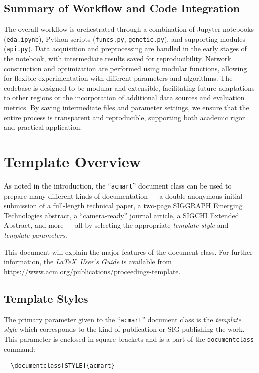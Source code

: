 \documentclass[manuscript,screen,review]{acmart}
\begin{document}
\subsection{Summary of Workflow and Code Integration}
The overall workflow is orchestrated through a combination of Jupyter notebooks (\texttt{eda.ipynb}), Python scripts (\texttt{funcs.py}, \texttt{genetic.py}), and supporting modules (\texttt{api.py}). Data acquisition and preprocessing are handled in the early stages of the notebook, with intermediate results saved for reproducibility. Network construction and optimization are performed using modular functions, allowing for flexible experimentation with different parameters and algorithms. The codebase is designed to be modular and extensible, facilitating future adaptations to other regions or the incorporation of additional data sources and evaluation metrics. By saving intermediate files and parameter settings, we ensure that the entire process is transparent and reproducible, supporting both academic rigor and practical application.

\section{Template Overview}
As noted in the introduction, the ``\verb|acmart|'' document class can
be used to prepare many different kinds of documentation --- a
double-anonymous initial submission of a full-length technical paper, a
two-page SIGGRAPH Emerging Technologies abstract, a ``camera-ready''
journal article, a SIGCHI Extended Abstract, and more --- all by
selecting the appropriate {\itshape template style} and {\itshape
  template parameters}.

This document will explain the major features of the document
class. For further information, the {\itshape \LaTeX\ User's Guide} is
available from
\url{https://www.acm.org/publications/proceedings-template}.

\subsection{Template Styles}

The primary parameter given to the ``\verb|acmart|'' document class is
the {\itshape template style} which corresponds to the kind of publication
or SIG publishing the work. This parameter is enclosed in square
brackets and is a part of the {\verb|documentclass|} command:
\begin{verbatim}
  \documentclass[STYLE]{acmart}
\end{verbatim}
\end{document}
